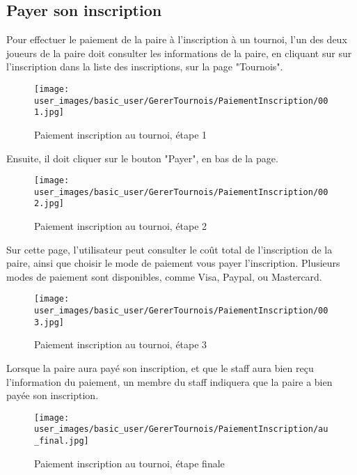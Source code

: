 \subsection{Payer son inscription}

Pour effectuer le paiement de la paire à l'inscription à un tournoi, l'un des deux joueurs de la paire doit consulter les informations de la paire, en cliquant sur sur l'inscription dans la liste des inscriptions, sur la page "Tournois".

\begin{figure}[H]
\centering
\texttt{[image: user\_images/basic\_user/GererTournois/PaiementInscription/001.jpg]}
\caption{Paiement inscription au tournoi, étape 1}
\end{figure}

Ensuite, il doit cliquer sur le bouton "Payer", en bas de la page.

\begin{figure}[H]
\centering
\texttt{[image: user\_images/basic\_user/GererTournois/PaiementInscription/002.jpg]}
\caption{Paiement inscription au tournoi, étape 2}
\end{figure}

Sur cette page, l'utilisateur peut consulter le coût total de l'inscription de la paire, ainsi que choisir le mode de paiement vous payer l'inscription. Plusieurs modes de paiement sont disponibles, comme Visa, Paypal, ou Mastercard.

\begin{figure}[H]
\centering
\texttt{[image: user\_images/basic\_user/GererTournois/PaiementInscription/003.jpg]}
\caption{Paiement inscription au tournoi, étape 3}
\end{figure}

Lorsque la paire aura payé son inscription, et que le staff aura bien reçu l'information du paiement, un membre du staff indiquera que la paire a bien payée son inscription.

\begin{figure}[H]
\centering
\texttt{[image: user\_images/basic\_user/GererTournois/PaiementInscription/au\_final.jpg]}
\caption{Paiement inscription au tournoi, étape finale}
\end{figure}